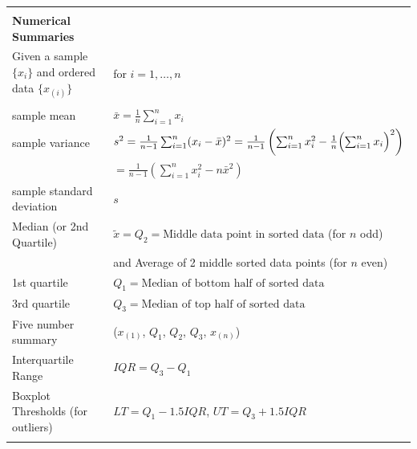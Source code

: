 \documentclass[bigtut]{tutorial}\usepackage[]{graphicx}\usepackage[]{color}
\begin{document}

\begin{tutorial}

\begin{center}
\begin{tabular}{| ll | } \hline
& \\
{\bf Numerical Summaries} & \\
Given a sample $\{x_i\}$ and ordered data $\{ x_{(i)} \} $ &  for $i=1,\ldots,n$ \\   
& \\
sample mean &  $\bar x = \frac{1}{n} \sum_{i=1}^n x_i$    \\ 
sample variance &  $s^2=  \frac{1}{n-1} \sum_{i=1}^n (x_i - \bar x)^2 
= \frac1{n-1}\left( \sum_{i=1}^n x_i^2 - \frac{1}{n}\Bigl(\sum_ {i=1}^n x_i\Bigr)^2\right)$ \\
&  $= \frac1{n-1}\left( \sum_{i=1}^n x_i^2 -  n \bar{x}^2  \right)$   \\
sample standard deviation &  $s$  \\
Median (or 2nd Quartile) & $\tilde{x} =Q_{2} =  \mbox{Middle data point in sorted data}$ (for $n$ odd) \\
 & and Average of 2 middle sorted data points (for $n$ even) \\
1st quartile &  $Q_{1}=  \mbox{Median of bottom half of sorted data}$  \\
3rd quartile &  $Q_{3}=  \mbox{Median of top half of sorted data}$ \\

Five number summary & ($x_{(1)}$, $Q_{1}$, $Q_{2}$, $Q_{3}$, $x_{(n)}$) \\ 
Interquartile Range & $IQR = Q_{3} - Q_{1}$ \\
Boxplot Thresholds (for outliers) & $LT = Q_{1} - 1.5 IQR$, $UT = Q_{3} + 1.5 IQR$ \\
& \\ \hline
\end{tabular}
\end{center}


\end{tutorial}
\end{document}

